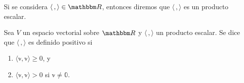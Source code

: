 \begin{definition}
    Si se considera $\langle \, , \rangle \in \RR$, entonces diremos que $\langle \, , \rangle$ es un producto escalar.
\end{definition}

\begin{definition}\label{def:def_posi}
    Sea $V$ un espacio vectorial sobre $\RR$ y $\langle \, , \rangle$ un producto escalar. Se dice que $\langle \, , \rangle$ es definido positivo si
    \begin{enumerate}[label=\roman*)]
        \item $\langle \mathbb{v}, \mathbb{v} \rangle \geq 0$, y
        \item $\langle \mathbb{v}, \mathbb{v} \rangle > 0$ si $\mathbb{v} \neq \mathbb{0}$.
    \end{enumerate}
\end{definition}

